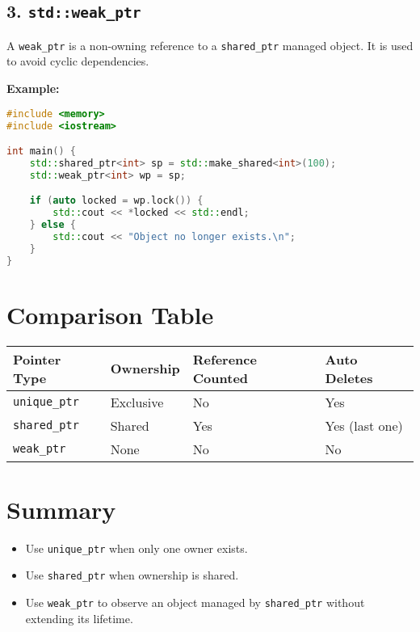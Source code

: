 \documentclass{article}
\begin{document}
\subsection*{3. \texttt{std::weak\_ptr}}
A \texttt{weak\_ptr} is a non-owning reference to a \texttt{shared\_ptr} managed object. It is used to avoid cyclic dependencies.

\textbf{Example:}
\begin{lstlisting}[language=C++]
#include <memory>
#include <iostream>

int main() {
    std::shared_ptr<int> sp = std::make_shared<int>(100);
    std::weak_ptr<int> wp = sp;

    if (auto locked = wp.lock()) {
        std::cout << *locked << std::endl;
    } else {
        std::cout << "Object no longer exists.\n";
    }
}
\end{lstlisting}

\section*{Comparison Table}
\begin{tabular}{|l|l|l|l|}
\hline
Pointer Type & Ownership & Reference Counted & Auto Deletes \\
\hline
\texttt{unique\_ptr} & Exclusive & No & Yes \\
\texttt{shared\_ptr} & Shared & Yes & Yes (last one) \\
\texttt{weak\_ptr} & None & No & No \\
\hline
\end{tabular}

\section*{Summary}
\begin{itemize}
  \item Use \texttt{unique\_ptr} when only one owner exists.
  \item Use \texttt{shared\_ptr} when ownership is shared.
  \item Use \texttt{weak\_ptr} to observe an object managed by \texttt{shared\_ptr} without extending its lifetime.
\end{itemize}
\end{document}
